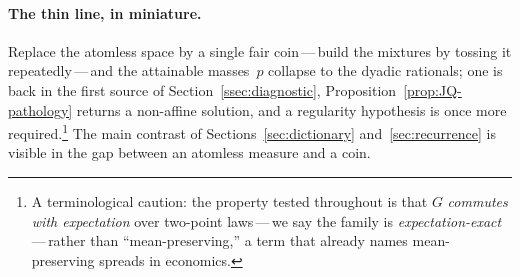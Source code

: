 \documentclass{article}
\theoremstyle{plain}
\theoremstyle{definition}
\begin{document}
\paragraph{The thin line, in miniature.}
Replace the atomless space by a single fair coin\,---\,build the
mixtures by tossing it repeatedly\,---\,and the attainable masses~$p$
collapse to the dyadic rationals; one is back in the first source of
Section~\ref{ssec:diagnostic}, Proposition~\ref{prop:JQ-pathology}
returns a non-affine solution, and a regularity hypothesis is once
more required.\footnote{A terminological caution: the property tested
throughout is that $G$ \emph{commutes with expectation} over
two-point laws\,---\,we say the family is
\emph{expectation-exact}\,---\,rather than ``mean-preserving,'' a
term that already names mean-preserving spreads in economics.} The
main contrast of Sections~\ref{sec:dictionary} and~\ref{sec:recurrence} is
visible in the gap between an atomless measure and a coin.
\end{document}

